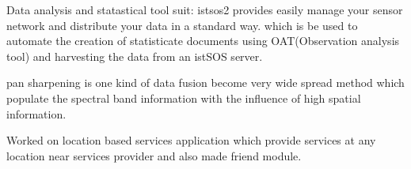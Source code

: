 \documentclass[]{meetresume-class}
\begin{document}
\begin{minipage}[t]{0.66\textwidth}
		 
		\noindent
		\hspace{5em}%
		\begin{minipage}{0.85\textwidth\vspace{2pt}}
			Data analysis and statastical tool suit: istsos2 provides easily manage your sensor network
			and distribute your data in a standard way. which is be used to automate the creation of statisticate
			documents using OAT(Observation analysis tool) and harvesting the data from an istSOS server.
		\end{minipage}
		\sectionsep
		
		 
		\noindent
		\hspace{5em}%
		\begin{minipage}{0.85\textwidth\vspace{2pt}}
			pan sharpening is one kind of data fusion become very wide spread method which populate the spectral band information with the influence of high spatial information.
		\end{minipage}
		\sectionsep
		
		 
		\noindent
		\hspace{5em}%
		\begin{minipage}{0.85\textwidth\vspace{2pt}}
			Worked on location based services application which provide services at any location near
			services provider and also made friend module.
		\end{minipage}

\end{minipage}
\end{document}

